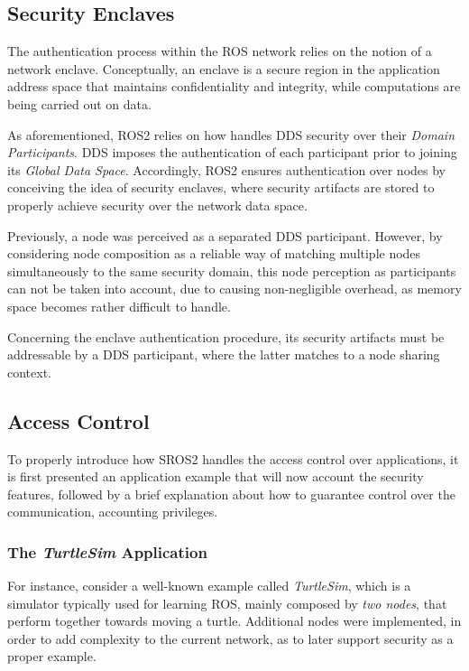 \subsection{Security Enclaves}

The authentication process within the ROS network relies on the notion of a network enclave. Conceptually, an enclave is a secure region in the application address space that maintains confidentiality and integrity, while computations are being carried out on data.

As aforementioned, ROS2 relies on how handles DDS security over their \textit{Domain Participants}. DDS imposes the authentication of each participant prior to joining its \textit{Global Data Space}. \cite{white2019network} Accordingly, ROS2 ensures authentication over nodes by conceiving the idea of security enclaves, where security artifacts are stored to properly achieve security over the network data space. \cite{ros-security-enclaves}

Previously, a node was perceived as a separated DDS participant. However, by considering node composition as a reliable way of matching multiple nodes simultaneously to the same security domain, this node perception as participants can not be taken into account, due to causing non-negligible overhead, as memory space becomes rather difficult to handle. \cite{ros-security-enclaves, ros-access-control}

Concerning the enclave authentication procedure, its security artifacts must be addressable by a DDS participant, where the latter matches to a node sharing context. \cite{ros-security-enclaves}

\subsection{Access Control}

To properly introduce how SROS2 handles the access control over applications, it is first presented an application example that will now account the security features, followed by a brief explanation about how to guarantee control over the communication, accounting privileges. 

\subsubsection{The \textit{TurtleSim} Application}

For instance, consider a well-known example called \textit{TurtleSim}, which is a simulator typically used for learning ROS, mainly composed by \textit{two nodes}, that perform together towards moving a turtle. Additional nodes were implemented, in order to add complexity to the current network, as to later support security as a proper example.

